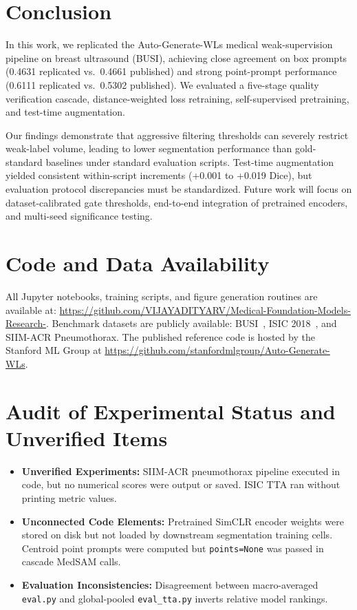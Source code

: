 \documentclass[journal,11pt,onecolumn,draftclsnofoot]{IEEEtran}
\begin{document}
\section{Conclusion}
\label{sec:conclusion}

In this work, we replicated the Auto-Generate-WLs medical weak-supervision pipeline on breast ultrasound (BUSI), achieving close agreement on box prompts (0.4631 replicated vs.\ 0.4661 published) and strong point-prompt performance (0.6111 replicated vs.\ 0.5302 published). We evaluated a five-stage quality verification cascade, distance-weighted loss retraining, self-supervised pretraining, and test-time augmentation. 

Our findings demonstrate that aggressive filtering thresholds can severely restrict weak-label volume, leading to lower segmentation performance than gold-standard baselines under standard evaluation scripts. Test-time augmentation yielded consistent within-script increments (+0.001 to +0.019 Dice), but evaluation protocol discrepancies must be standardized. Future work will focus on dataset-calibrated gate thresholds, end-to-end integration of pretrained encoders, and multi-seed significance testing.

\section*{Code and Data Availability}
All Jupyter notebooks, training scripts, and figure generation routines are available at: \url{https://github.com/VIJAYADITYARV/Medical-Foundation-Models-Research-}. Benchmark datasets are publicly available: BUSI~\cite{aldhabyani2020}, ISIC 2018~\cite{codella2019}, and SIIM-ACR Pneumothorax. The published reference code is hosted by the Stanford ML Group at \url{https://github.com/stanfordmlgroup/Auto-Generate-WLs}.

\appendices

\section{Audit of Experimental Status and Unverified Items}
\label{app:status}
\begin{itemize}
    \item \textbf{Unverified Experiments:} SIIM-ACR pneumothorax pipeline executed in code, but no numerical scores were output or saved. ISIC TTA ran without printing metric values.
    \item \textbf{Unconnected Code Elements:} Pretrained SimCLR encoder weights were stored on disk but not loaded by downstream segmentation training cells. Centroid point prompts were computed but \texttt{points=None} was passed in cascade MedSAM calls.
    \item \textbf{Evaluation Inconsistencies:} Disagreement between macro-averaged \texttt{eval.py} and global-pooled \texttt{eval\_tta.py} inverts relative model rankings.
\end{itemize}
\end{document}
